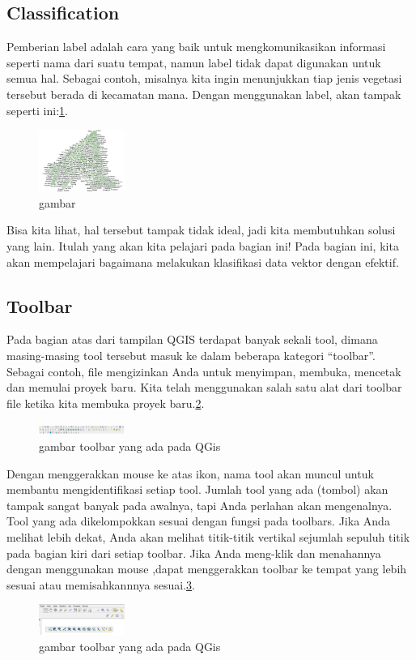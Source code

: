 \subsection{Classification}
Pemberian label adalah cara yang baik untuk mengkomunikasikan informasi seperti nama dari suatu tempat, namun label tidak dapat digunakan untuk semua hal. Sebagai contoh, misalnya kita ingin menunjukkan tiap jenis vegetasi tersebut berada di kecamatan mana. Dengan menggunakan label, akan tampak seperti ini:\ref{image13}.
\begin{figure}[ht]
        \centerline{\includegraphics[width=0.25\textwidth]{figures/image13}}
        \caption{gambar}
        \label{image13}
        \end{figure}
Bisa kita lihat, hal tersebut tampak tidak ideal, jadi kita membutuhkan solusi yang lain. Itulah yang akan kita pelajari pada bagian ini! Pada bagian ini, kita akan mempelajari bagaimana melakukan klasifikasi data vektor dengan efektif.


\subsection{Toolbar}
Pada bagian atas dari tampilan QGIS terdapat banyak sekali tool, dimana masing-masing tool tersebut masuk ke dalam beberapa kategori “toolbar”. Sebagai contoh,  file mengizinkan Anda untuk menyimpan, membuka, mencetak dan memulai proyek baru. Kita telah menggunakan salah satu alat dari toolbar file ketika kita membuka proyek baru.\ref{toolbar}.
\begin{figure}[ht]
    \centerline{\includegraphics[width=0.25\textwidth]{figures/toolbar.png}}
    \caption{gambar toolbar yang ada pada QGis}
    \label{toolbar}
    \end{figure}

Dengan menggerakkan mouse ke atas ikon, nama tool akan muncul untuk membantu mengidentifikasi setiap tool. Jumlah tool yang ada (tombol) akan tampak sangat banyak pada awalnya, tapi Anda perlahan akan mengenalnya. Tool yang ada dikelompokkan sesuai dengan fungsi pada toolbars. Jika Anda melihat lebih dekat, Anda akan melihat titik-titik vertikal sejumlah sepuluh titik pada bagian kiri dari setiap toolbar. Jika Anda meng-klik dan menahannya dengan menggunakan mouse ,dapat menggerakkan toolbar ke tempat yang lebih sesuai atau memisahkannnya sesuai.\ref{toolbar1}.
\begin{figure}[ht]
    \centerline{\includegraphics[width=0.25\textwidth]{figures/toolbar1.png}}
    \caption{gambar toolbar yang ada pada QGis}
    \label{toolbar1}
    \end{figure}
    
